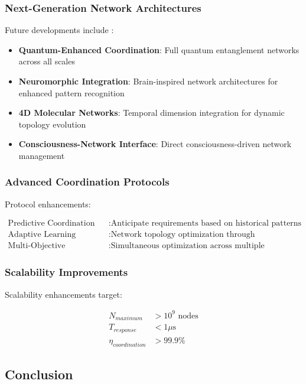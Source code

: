 \subsubsection{Next-Generation Network Architectures}

Future developments include \cite{sterling2015principles,vedral2011living}:

\begin{itemize}
\item \textbf{Quantum-Enhanced Coordination}: Full quantum entanglement networks across all scales
\item \textbf{Neuromorphic Integration}: Brain-inspired network architectures for enhanced pattern recognition
\item \textbf{4D Molecular Networks}: Temporal dimension integration for dynamic topology evolution
\item \textbf{Consciousness-Network Interface}: Direct consciousness-driven network management
\end{itemize}

\subsubsection{Advanced Coordination Protocols}

Protocol enhancements:

\begin{align}
\text{Predictive Coordination} &: \text{Anticipate requirements based on historical patterns} \\
\text{Adaptive Learning} &: \text{Network topology optimization through reinforcement learning} \\
\text{Multi-Objective Optimization} &: \text{Simultaneous optimization across multiple performance metrics}
\end{align}

\subsubsection{Scalability Improvements}

Scalability enhancements target:

\begin{align}
N_{maximum} &> 10^9 \text{ nodes} \\
T_{response} &< 1 \mu\text{s} \\
\eta_{coordination} &> 99.9\%
\end{align}

\subsection{Conclusion}

